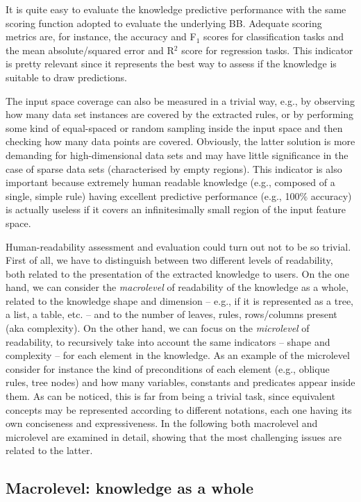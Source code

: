 \documentclass[sigconf]{acmart}
\begin{document}
It is quite easy to evaluate the knowledge predictive performance with the same scoring function adopted to evaluate the underlying BB.
%
Adequate scoring metrics are, for instance, the accuracy and F$_1$ scores for classification tasks and the mean absolute/squared error and R$^2$ score for regression tasks.
%
This indicator is pretty relevant since it represents the best way to assess if the knowledge is suitable to draw predictions.

The input space coverage can also be measured in a trivial way, e.g., by observing how many data set instances are covered by the extracted rules, or by performing some kind of equal-spaced or random sampling inside the input space and then checking how many data points are covered.
%
Obviously, the latter solution is more demanding for high-dimensional data sets and may have little significance in the case of sparse data sets (characterised by empty regions).
%
This indicator is also important because extremely human readable knowledge (e.g., composed of a single, simple rule) having excellent predictive performance (e.g., 100\% accuracy) is actually useless if it covers an infinitesimally small region of the input feature space.

Human-readability assessment and evaluation could turn out not to be so trivial.
%
First of all, we have to distinguish between two different levels of readability, both related to the presentation of the extracted knowledge to users.
%
On the one hand, we can consider the \emph{macrolevel} of readability of the knowledge as a whole, related to the knowledge shape and dimension -- e.g., if it is represented as a tree, a list, a table, etc. -- and to the number of leaves, rules, rows/columns present (aka complexity).
%
On the other hand, we can focus on the \emph{microlevel} of readability,  to recursively take into account the same indicators -- shape and complexity -- for each element in the knowledge.
%
As an example of the microlevel consider for instance the kind of preconditions of each element (e.g., oblique rules, \mofn{} tree nodes) and how many variables, constants and predicates appear inside them.
%
As can be noticed, this is far from being a trivial task, since equivalent concepts may be represented according to different notations, each one having its own conciseness and expressiveness.
%
In the following both macrolevel and microlevel are examined in detail, showing that the most challenging issues are related to the latter.

\subsection{Macrolevel: knowledge as a whole}\label{ssec:macro}
\end{document}
